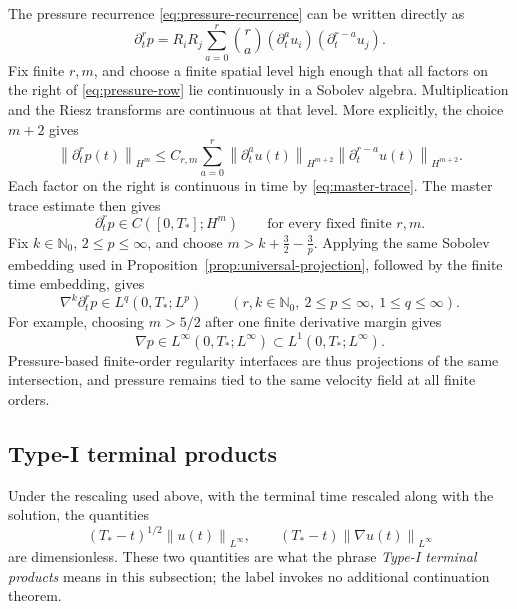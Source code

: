 \documentclass[11pt,letterpaper]{article}
\theoremstyle{definition}
\theoremstyle{remark}
\newcommand{\Nzero}{\mathbb N_0}
\newcommand{\norm}[1]{\left\lVert #1\right\rVert}
\begin{document}
The pressure recurrence \eqref{eq:pressure-recurrence} can be written
directly as
\begin{equation}
\partial_t^r p
=R_iR_j\sum_{a=0}^{r}\binom{r}{a}
(\partial_t^a u_i)(\partial_t^{r-a}u_j).
\label{eq:pressure-row}
\end{equation}
Fix finite \(r,m\), and choose a finite spatial level high enough that all
factors on the right of \eqref{eq:pressure-row} lie continuously in a
Sobolev algebra.  Multiplication and the Riesz transforms are continuous at
that level.  More explicitly, the choice \(m+2\) gives
\begin{equation}
\norm{\partial_t^r p(t)}_{H^m}
\le C_{r,m}\sum_{a=0}^{r}
\norm{\partial_t^a u(t)}_{H^{m+2}}
\norm{\partial_t^{r-a}u(t)}_{H^{m+2}}.
\label{eq:pressure-product-bound}
\end{equation}
Each factor on the right is continuous in time by
\eqref{eq:master-trace}.  The master trace estimate then gives
\begin{equation}
\partial_t^r p\in C([0,T_*];H^m)
\qquad\text{for every fixed finite }r,m.
\label{eq:pressure-all-orders}
\end{equation}
Fix \(k\in\Nzero\), \(2\le p\le\infty\), and choose
\(m>k+\frac32-\frac3p\).  Applying the same Sobolev embedding used in
Proposition~\ref{prop:universal-projection}, followed by the finite time
embedding, gives
\begin{equation}
\nabla^k\partial_t^r p
\in L^q(0,T_*;L^p)
\qquad
\left(
r,k\in\Nzero,\ 2\le p\le\infty,\ 1\le q\le\infty
\right).
\label{eq:pressure-mixed-norms}
\end{equation}
For example, choosing \(m>5/2\) after one finite derivative margin gives
\[
\nabla p\in L^\infty(0,T_*;L^\infty)
\subset L^1(0,T_*;L^\infty).
\]
Pressure-based finite-order regularity interfaces are thus projections of
the same intersection, and pressure remains tied to the same velocity field
at all finite orders.

\subsection{Type-I terminal products}

Under the rescaling used above, with the terminal time rescaled along with
the solution, the quantities
\[
(T_*-t)^{1/2}\norm{u(t)}_{L^\infty},
\qquad
(T_*-t)\norm{\nabla u(t)}_{L^\infty}
\]
are dimensionless.  These two quantities are what the phrase
\emph{Type-I terminal products} means in this subsection; the label invokes no additional
continuation theorem.
\end{document}
